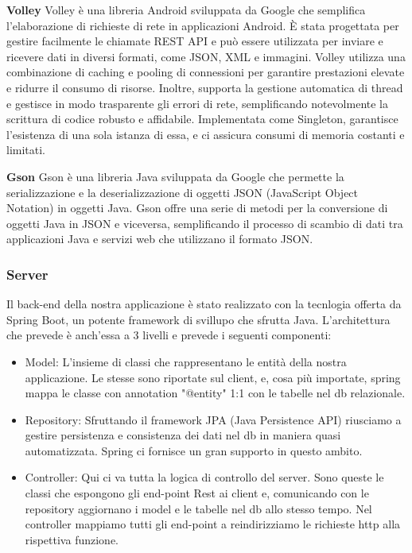 \begin{flushleft}
        \textbf{Volley} Volley è una libreria Android sviluppata da Google che semplifica l'elaborazione di richieste di rete in applicazioni Android. È stata progettata per gestire facilmente le chiamate REST API e può essere utilizzata per inviare e ricevere dati in diversi formati, come JSON, XML e immagini.
        Volley utilizza una combinazione di caching e pooling di connessioni per garantire prestazioni elevate e ridurre il consumo di risorse. Inoltre, supporta la gestione automatica di thread e gestisce in modo trasparente gli errori di rete, semplificando notevolmente la scrittura di codice robusto e affidabile.
        Implementata come Singleton, garantisce l'esistenza di una sola istanza di essa, e ci assicura consumi di memoria costanti e limitati.
        
        \textbf{Gson} Gson è una libreria Java sviluppata da Google che permette la serializzazione e la deserializzazione di oggetti JSON (JavaScript Object Notation) in oggetti Java. Gson offre una serie di metodi per la conversione di oggetti Java in JSON e viceversa, semplificando il processo di scambio di dati tra applicazioni Java e servizi web che utilizzano il formato JSON. 
    \end{flushleft}
    \vspace{0.2cm}


    \subsubsection{Server}
    \begin{flushleft}
        Il back-end della nostra applicazione è stato realizzato con la tecnlogia offerta da Spring Boot, un potente framework di svillupo che sfrutta Java.
        L'architettura che prevede è anch'essa a 3 livelli e prevede i seguenti componenti:
        \begin{itemize}
            \item Model: L'insieme di classi che rappresentano le entità della nostra applicazione. Le stesse sono riportate sul client, e, cosa più importate, spring mappa le classe con annotation "@entity" 1:1 con le tabelle nel db relazionale.\\
            \item Repository: Sfruttando il framework JPA (Java Persistence API) riusciamo a gestire persistenza e consistenza dei dati nel db in maniera quasi automatizzata. Spring ci fornisce un gran supporto in questo ambito.
            \item Controller: Qui ci va tutta la logica di controllo del server. Sono queste le classi che espongono gli end-point Rest ai client e, comunicando con le repository aggiornano i model e le tabelle nel db allo stesso tempo. Nel controller mappiamo tutti gli end-point a reindirizziamo le richieste http alla rispettiva funzione.
        \end{itemize}
    \end{flushleft}

